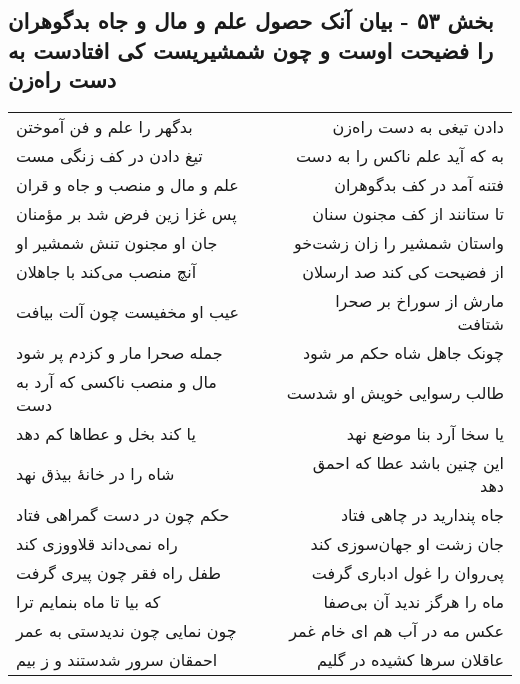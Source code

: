 \begin{center}
\section*{بخش ۵۳ - بیان آنک حصول علم و مال و جاه بدگوهران را فضیحت اوست و چون شمشیریست کی افتادست به دست راه‌زن}
\label{sec:sh053}
\begin{longtable}{l p{0.5cm} r}
بدگهر را علم و فن آموختن
&&
دادن تیغی به دست راه‌زن
\\
تیغ دادن در کف زنگی مست
&&
به که آید علم ناکس را به دست
\\
علم و مال و منصب و جاه و قران
&&
فتنه آمد در کف بدگوهران
\\
پس غزا زین فرض شد بر مؤمنان
&&
تا ستانند از کف مجنون سنان
\\
جان او مجنون تنش شمشیر او
&&
واستان شمشیر را زان زشت‌خو
\\
آنچ منصب می‌کند با جاهلان
&&
از فضیحت کی کند صد ارسلان
\\
عیب او مخفیست چون آلت بیافت
&&
مارش از سوراخ بر صحرا شتافت
\\
جمله صحرا مار و کزدم پر شود
&&
چونک جاهل شاه حکم مر شود
\\
مال و منصب ناکسی که آرد به دست
&&
طالب رسوایی خویش او شدست
\\
یا کند بخل و عطاها کم دهد
&&
یا سخا آرد بنا موضع نهد
\\
شاه را در خانهٔ بیذق نهد
&&
این چنین باشد عطا که احمق دهد
\\
حکم چون در دست گمراهی فتاد
&&
جاه پندارید در چاهی فتاد
\\
راه نمی‌داند قلاووزی کند
&&
جان زشت او جهان‌سوزی کند
\\
طفل راه فقر چون پیری گرفت
&&
پی‌روان را غول ادباری گرفت
\\
که بیا تا ماه بنمایم ترا
&&
ماه را هرگز ندید آن بی‌صفا
\\
چون نمایی چون ندیدستی به عمر
&&
عکس مه در آب هم ای خام غمر
\\
احمقان سرور شدستند و ز بیم
&&
عاقلان سرها کشیده در گلیم
\\
\end{longtable}
\end{center}
